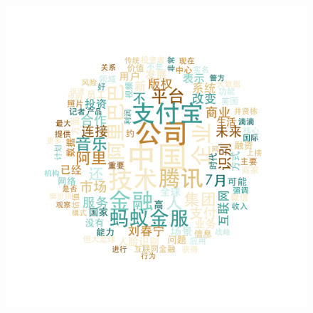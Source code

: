 \documentclass[11pt]{beamer}
\begin{document}
\begin{frame}
\begin{figure}
    \includegraphics[height=0.3\textheight]{plot/Jul-wordcloud}\\

  \end{figure}
\end{frame}
\end{document}
